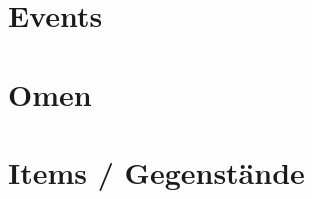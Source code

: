\documentclass[11pt]{article}
\begin{document}


\twocolumn
\section{Events}



\pagebreak
\pagebreak

\twocolumn
\section{Omen}



\pagebreak

\section{Items / Gegenstände}


\end{document}
